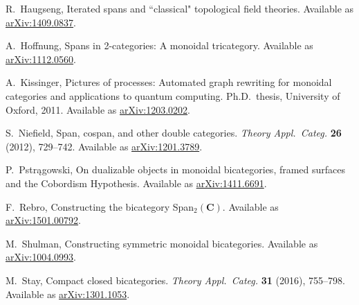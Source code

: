 \documentclass{tac}
\theoremstyle{remark}
\theoremstyle{definition}
\begin{document}
\begin{thebibliography}{100}
R.~Haugseng,
Iterated spans and ``classical"
topological field theories.
Available as \href{https://arxiv.org/abs/1409.0837}{arXiv:1409.0837}.

A.~Hoffnung,
Spans in 2-categories: A monoidal tricategory.
Available as \href{https://arxiv.org/abs/1112.0560}{arXiv:1112.0560}.

A.~Kissinger,
Pictures of processes: Automated 
graph rewriting for monoidal categories 
and applications to quantum computing. Ph.D.\ thesis, University of Oxford, 2011.
Available as \href{https://arxiv.org/abs/1203.0202}{arXiv:1203.0202}.

S.~Niefield,
Span, cospan, and other double categories.
\textsl{Theory Appl.\ Categ.}
\textbf{26} (2012), 729--742.
Available as \href{https://arxiv.org/abs/1201.3789}{arXiv:1201.3789}.

P.~Pstr{\k{a}}gowski,
On dualizable objects in monoidal bicategories, 
framed surfaces and the Cobordism Hypothesis.
Available as \href{https://arxiv.org/abs/1411.6691}{arXiv:1411.6691}.

F.~Rebro, 
Constructing the bicategory Span$_{2}(\textbf{C})$. 
Available as \href{https://arxiv.org/abs/1501.00792}{arXiv:1501.00792}.

M.~Shulman, 
Constructing symmetric monoidal bicategories. 
Available as \href{http://arxiv.org/abs/1004.0993}{arXiv:1004.0993}.

 M.~Stay, 
Compact closed bicategories.
\textsl{Theory Appl.\ Categ.} 
\textbf{31} (2016), 755--798. 
Available as \href{http://arxiv.org/abs/1301.1053}{arXiv:1301.1053}.

\end{thebibliography}


%
%
\end{document}
